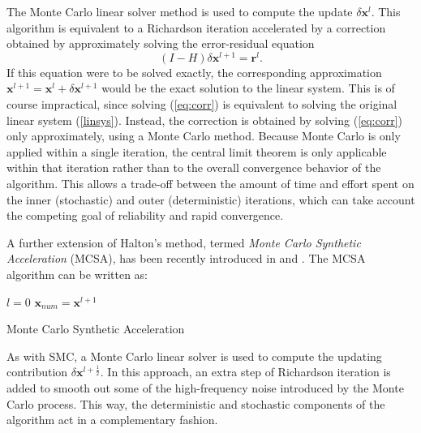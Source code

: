 \documentclass[final,leqno,onefignum,onetabnum]{siamltex1213}
\begin{document}
The Monte Carlo linear solver method is used to compute the update $\delta
\mathbf{x}^{l}$.  This algorithm is equivalent to a Richardson iteration
accelerated by a correction obtained by approximately solving the error-residual
equation
\begin{equation}
(I - H)\delta \mathbf{x}^{l+1} = \mathbf{r}^{l}.
\label{eq:corr}
\end{equation}
If this equation were to be solved exactly, the corresponding approximation
$\mathbf{x}^{l+1}=\mathbf{x}^{l}+\delta \mathbf{x}^{l+1}$ would be the exact
solution to the linear system. This is of course impractical, since solving
(\ref{eq:corr}) is equivalent to solving the original linear system
(\ref{linsys}). Instead, the correction is obtained by
solving (\ref{eq:corr}) only approximately, using a Monte Carlo method.
Because Monte Carlo is only applied within a single iteration, the central
limit theorem is only applicable within that iteration rather than to
the overall convergence behavior of the algorithm. This allows a trade-off
between the amount of time and effort spent on the inner (stochastic) and
outer (deterministic) iterations, which can take account the competing goal
of reliability and rapid convergence.

A further extension of Halton's method, termed
\textit{Monte Carlo Synthetic Acceleration} (MCSA), has been recently
introduced in \cite{ESW2013} and \cite{EMSH2014}.  The MCSA algorithm can be 
written as:

\begin{algorithm}[H]
\LinesNumbered
 $l=0$\;
 $\mathbf{x}_{num}=\mathbf{x}^{l+1}$\;
 \caption{Monte Carlo Synthetic Acceleration}
\end{algorithm}

As with SMC, a Monte Carlo linear solver is used to compute the updating
contribution $\delta \mathbf{x}^{l+\frac{1}{2}}$.  In this approach, an
extra step of Richardson iteration is added to smooth out
some of the high-frequency noise introduced by the Monte Carlo process.
This way, the deterministic and stochastic components of the algorithm
act in a complementary fashion.
\end{document}
